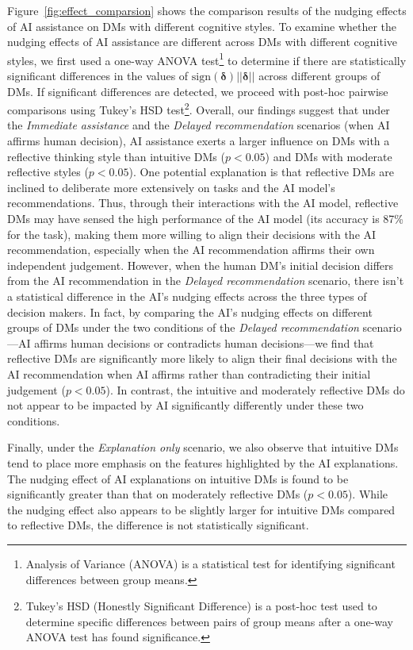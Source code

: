 \documentclass[letterpaper]{article} %
\begin{document}
Figure~\ref{fig:effect_comparsion} shows the comparison results of the nudging effects of AI assistance on DMs with different cognitive styles. To examine whether the nudging effects of AI assistance are different across DMs with different cognitive styles,  
we first used a one-way ANOVA test\footnote{Analysis of Variance (ANOVA) is a statistical test for identifying significant differences between group means.} to determine if there are statistically significant differences in the values of $\text{sign}(\bm{\delta})||\bm{\delta}||$ across different groups of DMs. If significant differences are detected, we proceed with post-hoc pairwise comparisons using Tukey's HSD test\footnote{Tukey's HSD (Honestly Significant Difference) is a post-hoc test used to determine specific differences between pairs of group means after a one-way ANOVA test has found significance.}.
Overall, our findings suggest that under the \emph{Immediate assistance} and the \emph{Delayed recommendation} scenarios (when AI affirms human decision), AI assistance exerts a larger influence on DMs with a reflective thinking style than intuitive DMs ($p<0.05$) and DMs with moderate reflective styles ($p<0.05$). One potential explanation is that reflective DMs are inclined to deliberate more extensively on tasks and 
the AI model's recommendations. 
Thus, through their interactions with the AI model, reflective DMs may have sensed the high performance of the AI model (its accuracy is 87\% for the task), making them more willing to align their decisions with the AI recommendation, especially when the AI recommendation affirms their own independent judgement. However, when the human DM's initial decision differs from the AI recommendation in the \emph{Delayed recommendation} scenario, there isn't a statistical difference in the AI's nudging effects across the three types of decision makers. In fact, by comparing the AI's nudging effects on different groups of DMs under the two conditions of the \emph{Delayed recommendation} scenario---AI affirms human decisions or contradicts human decisions---we find that reflective DMs are significantly more likely to align their final decisions with the AI recommendation when AI affirms rather than contradicting their initial judgement ($p<0.05$). In contrast, the intuitive and moderately reflective DMs do not appear to be impacted by AI significantly differently under these two conditions.

 
Finally, under the \emph{Explanation only} scenario, we also observe that intuitive DMs tend to place more emphasis on the features highlighted by the AI explanations. The nudging effect of AI explanations on intuitive DMs is found to be significantly greater than that on moderately reflective DMs ($p<0.05$). While the nudging effect also appears to be slightly larger for intuitive DMs compared to reflective DMs, the difference is not statistically significant. 
 
\end{document}
